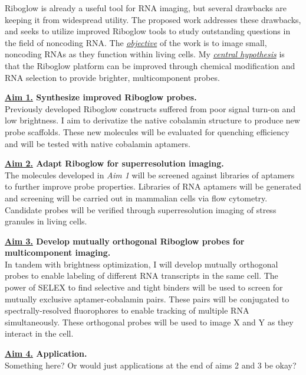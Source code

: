 \documentclass[11pt]{article}
\begin{document}
Riboglow is already a useful tool for RNA imaging, but several drawbacks are keeping it from widespread utility. The proposed work addresses these drawbacks, and seeks to utilize improved Riboglow tools to study outstanding questions in the field of noncoding RNA. The \underline{\textit {objective}} of the work is to image small, noncoding RNAs as they function within living cells. My \underline{\textit{central hypothesis}} is that the Riboglow platform can be improved through chemical modification and RNA selection to provide brighter, multicomponent probes.

{\bf \underline{Aim 1.} Synthesize improved Riboglow probes.}\\
Previously developed Riboglow constructs suffered from poor signal turn-on and low brightness. I aim to derivatize the native cobalamin structure to produce new probe scaffolds. These new molecules will be evaluated for quenching efficiency and will be tested with native cobalamin aptamers.

{\bf \underline{Aim 2.} Adapt Riboglow for superresolution imaging.}\\
The molecules developed in \textit{Aim 1} will be screened against libraries of aptamers to further improve probe properties. Libraries of RNA aptamers will be generated and screening will be carried out in mammalian cells via flow cytometry. Candidate probes will be verified through superresolution imaging of stress granules in living cells.

{\bf \underline{Aim 3.} Develop mutually orthogonal Riboglow probes for multicomponent imaging.}\\
In tandem with brightness optimization, I will develop mutually orthogonal probes to enable labeling of different RNA transcripts in the same cell. The power of SELEX to find selective and tight binders will be used to screen for mutually exclusive aptamer-cobalamin pairs. These pairs will be conjugated to spectrally-resolved fluorophores to enable tracking of multiple RNA simultaneously. These orthogonal probes will be used to image X and Y as they interact in the cell.

{\bf \underline{Aim 4.} Application.}\\
Something here? Or would just applications at the end of aims 2 and 3 be okay?


\end{document}
